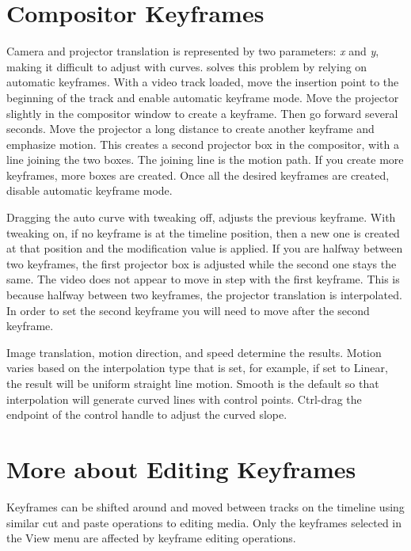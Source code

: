 \section{Compositor Keyframes}%
\label{sec:compositor_keyframes}

Camera and projector translation is represented by two parameters: \textit{x} and \textit{y}, making it difficult to adjust with curves.  \CGG{} solves this problem by relying on automatic keyframes.  With a video track loaded, move the insertion point to the beginning of the track and enable automatic keyframe mode.  Move the projector slightly in the compositor window to create a keyframe.  Then go forward several seconds.  Move the projector a long distance to create another keyframe and emphasize motion.  This creates a second projector box in the compositor, with a line joining the two boxes. The joining line is the motion path.  If you create more keyframes, more boxes are created.  Once all the desired keyframes are created, disable automatic keyframe mode.

Dragging the auto curve with tweaking off, adjusts the previous keyframe.  With tweaking on, if no keyframe is at the timeline position, then a new one is created at that position and the modification value is applied.  If you are halfway between two keyframes, the first projector box is adjusted while the second one stays the same.  The video does not appear to move in step with the first keyframe.  This is because halfway between two keyframes, the projector translation is interpolated.  In order to set the second keyframe you will need to move after the second keyframe.

Image translation, motion direction, and speed determine the results.  Motion varies based on the  interpolation type that is set, for example, if set to Linear, the result will be uniform straight line motion.  Smooth is the default so that interpolation will generate curved lines with control points.  Ctrl-drag the endpoint of the control handle to adjust the curved slope.

\section{More about Editing Keyframes}%
\label{sec:more_about_editing_keyframes}

Keyframes can be shifted around and moved between tracks on the timeline using similar cut and paste operations to editing media.  Only the keyframes selected in the View menu are affected by keyframe editing operations.

